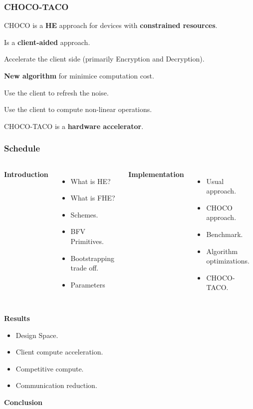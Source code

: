 \documentclass[10pt]{beamer}
\begin{document}
\begin{frame}
    \frametitle{CHOCO-TACO}

    CHOCO is a \textbf{HE} approach for devices with \textbf{constrained resources}.

    Is a \textbf{client-aided} approach.
\pause

    Accelerate the client side (primarily Encryption and Decryption).

    \textbf{New algorithm} for minimice computation cost.

\pause
    Use the client to refresh the noise.

    Use the client to compute non-linear operations.

    CHOCO-TACO is a \textbf{hardware accelerator}.
\end{frame}
\begin{frame}[noframenumbering]
    \frametitle{Schedule}
\begin{columns}
\centering
    \textbf{Introduction}
    \begin{itemize}
        \item What is HE?
        \item What is FHE?
        \item Schemes.
        \item BFV Primitives.
        \item Bootstrapping trade off.
        \item Parameters
    \end{itemize}

\pause
\centering
    \textbf{Implementation}
    \begin{itemize}
        \item Usual approach.
        \item CHOCO approach.
        \item Benchmark.
        \item Algorithm optimizations.
        \item CHOCO-TACO.
    \end{itemize}
\end{columns}
\pause
\centering
    \textbf{Results}
  \begin{center}
    \begin{minipage}{0.5\textwidth}
      \begin{itemize}
        \item Design Space.
        \item Client compute acceleration.
        \item Competitive compute.
        \item Communication reduction.
      \end{itemize}
    \end{minipage}
  \end{center}
  \centering
    \textbf{Conclusion}
\end{frame}
\end{document}
